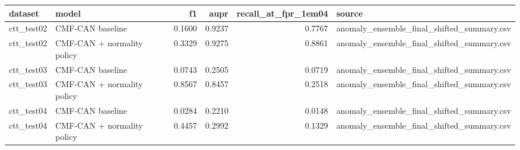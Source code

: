 \begin{tabular}{llrrrl}
\toprule
dataset & model & f1 & aupr & recall\_at\_fpr\_1em04 & source \\
\midrule
ctt\_test02 & CMF-CAN baseline & 0.1600 & 0.9237 & 0.7767 & anomaly\_ensemble\_final\_shifted\_summary.csv \\
ctt\_test02 & CMF-CAN + normality policy & 0.3329 & 0.9275 & 0.8861 & anomaly\_ensemble\_final\_shifted\_summary.csv \\
ctt\_test03 & CMF-CAN baseline & 0.0743 & 0.2505 & 0.0719 & anomaly\_ensemble\_final\_shifted\_summary.csv \\
ctt\_test03 & CMF-CAN + normality policy & 0.8567 & 0.8457 & 0.2518 & anomaly\_ensemble\_final\_shifted\_summary.csv \\
ctt\_test04 & CMF-CAN baseline & 0.0284 & 0.2210 & 0.0148 & anomaly\_ensemble\_final\_shifted\_summary.csv \\
ctt\_test04 & CMF-CAN + normality policy & 0.4457 & 0.2992 & 0.1329 & anomaly\_ensemble\_final\_shifted\_summary.csv \\
\bottomrule
\end{tabular}
